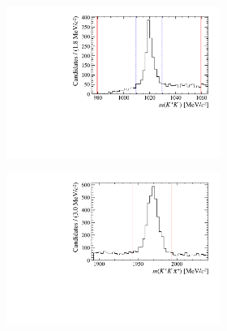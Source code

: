 \begin{figure}[!h]
   \centering
   \begin{subfigure}[t]{1.0\textwidth}
   \centering
     \begin{subfigure}[t]{0.35\textwidth}
        \centering
        \includegraphics[width=1.0\textwidth]{figs/Selection/Phimass_KKPi_B2DsPhi.pdf}
     \end{subfigure}
     \begin{subfigure}[t]{0.35\textwidth}
        \centering
        \includegraphics[width=1.0\textwidth]{figs/Selection/Dmass_KKPi_B2DsPhi.pdf}
     \end{subfigure}
     \caption{\decay{\Dsp}{\Kp\Km\pip}}
   \end{subfigure}   
   \begin{subfigure}[t]{1.0\textwidth}

\end{subfigure}
\end{figure}

